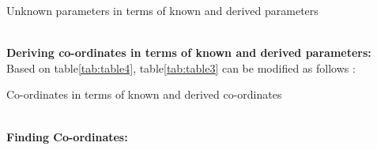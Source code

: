 \documentclass{article}
\begin{document}
\begin{table}[h]
	\centering
	
	\caption{Unknown parameters in terms of known and derived parameters}
	\label{tab:table4}
\end{table}\\
\textbf{Deriving co-ordinates in terms of known and derived parameters:}\\
Based on table\ref{tab:table4}, table\ref{tab:table3} can be modified as follows :\\
\begin{table}[h]
	\centering
	
	\caption{Co-ordinates in terms of known and derived co-ordinates}
	\label{tab:table5}
\end{table}\\
\textbf{Finding Co-ordinates:}\\
\end{document}
